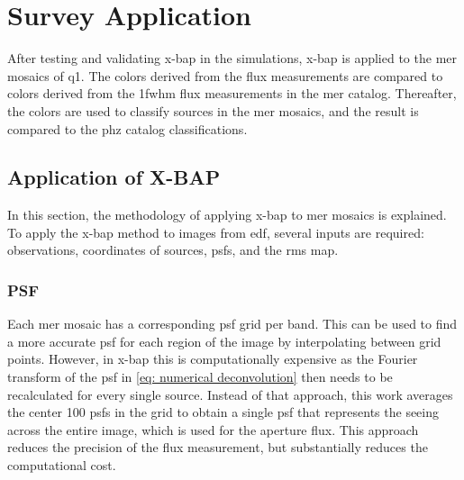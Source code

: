 \chapter{Survey Application}\label{ch: survey application}
After testing and validating \gls{x-bap} in the simulations, \gls{x-bap} is applied to the \gls{mer} mosaics of \gls{q1}. The colors derived from the flux measurements are compared to colors derived from the 1\gls{fwhm} flux measurements in the \gls{mer} catalog. Thereafter, the colors are used to classify sources in the \gls{mer} mosaics, and the result is compared to the \gls{phz} catalog classifications. 

\section{Application of X-BAP}

In this section, the methodology of applying \gls{x-bap} to \gls{mer} mosaics is explained. To apply the \gls{x-bap} method to images from \gls{edf}, several inputs are required: observations, coordinates of sources, \glspl{psf}, and the \gls{rms} map.

\subsection{PSF}

Each \gls{mer} mosaic has a corresponding \gls{psf} grid per band. This can be used to find a more accurate \gls{psf} for each region of the image by interpolating between grid points. However, in \gls{x-bap} this is computationally expensive as the Fourier transform of the \gls{psf} in \autoref{eq: numerical deconvolution} then needs to be recalculated for every single source. Instead of that approach, this work averages the center 100 \glspl{psf} in the grid to obtain a single \gls{psf} that represents the seeing across the entire image, which is used for the aperture flux. This approach reduces the precision of the flux measurement, but substantially reduces the computational cost.




